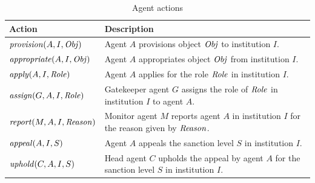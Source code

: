\begin{table}
\centering
\caption{Agent actions}\label{table:agact}
\begin{tabular}{ l | p{}}
\hline
Action & Description \\
\hline
$\mathit{provision}(A,I,\mathit{Obj})$ & Agent $A$ provisions object $\mathit{Obj}$ to institution $I$. \\
$\mathit{appropriate}(A,I,\mathit{Obj})$ & Agent $A$ appropriates object $\mathit{Obj}$ from institution $I$. \\
$\mathit{apply}(A,I,\mathit{Role})$ & Agent $A$ applies for the role $\mathit{Role}$ in institution $I$. \\
$\mathit{assign}(G,A,I,\mathit{Role})$ & Gatekeeper agent $G$ assigns the role of $\mathit{Role}$ in institution $I$ to agent $A$. \\
$\mathit{report}(M,A,I,\mathit{Reason})$ & Monitor agent $M$ reports agent $A$ in institution $I$ for the reason given by $\mathit{Reason}$. \\
$\mathit{appeal}(A,I,S)$ & Agent $A$ appeals the sanction level $S$ in institution $I$. \\
$\mathit{uphold}(C,A,I,S)$ & Head agent $C$ upholds the appeal by agent $A$ for the sanction level $S$ in institution $I$.
\end{tabular}
\end{table}
%
